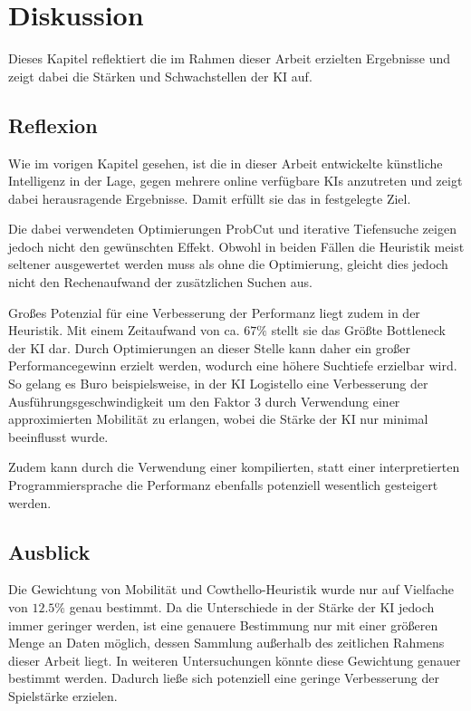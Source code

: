 
\chapter{Diskussion}
\label{chap:diskussion}
Dieses Kapitel reflektiert die im Rahmen dieser Arbeit erzielten Ergebnisse und zeigt dabei die Stärken und
Schwachstellen der \ac{KI} auf.

\section{Reflexion}
Wie im vorigen Kapitel gesehen, ist die in dieser Arbeit entwickelte künstliche Intelligenz in der Lage, gegen mehrere
online verfügbare \acp{KI} anzutreten und zeigt dabei herausragende Ergebnisse. Damit erfüllt sie das in \label{sec:goal}
festgelegte Ziel.

Die dabei verwendeten Optimierungen ProbCut und iterative Tiefensuche zeigen jedoch nicht den gewünschten Effekt.
Obwohl in beiden Fällen die Heuristik meist seltener ausgewertet werden muss als ohne die Optimierung, gleicht dies jedoch
nicht den Rechenaufwand der zusätzlichen Suchen aus.

Großes Potenzial für eine Verbesserung der Performanz liegt zudem in der Heuristik. Mit einem Zeitaufwand von ca.
\(67\%\) stellt sie das Größte Bottleneck der \ac{KI} dar. Durch Optimierungen an dieser Stelle kann daher ein großer
Performancegewinn erzielt werden, wodurch eine höhere Suchtiefe erzielbar wird. So gelang es Buro beispielsweise, in der
\ac{KI} Logistello eine Verbesserung der Ausführungsgeschwindigkeit um den Faktor 3 durch Verwendung einer approximierten
Mobilität zu erlangen, wobei die Stärke der \ac{KI} nur minimal beeinflusst wurde. \cite[S.~8]{evaluationfunctions}

Zudem kann durch die Verwendung einer kompilierten, statt einer interpretierten Programmiersprache die Performanz
ebenfalls potenziell wesentlich gesteigert werden.


\section{Ausblick}
Die Gewichtung von Mobilität und Cowthello-Heuristik wurde nur auf Vielfache von \(12.5\%\) genau bestimmt. Da die
Unterschiede in der Stärke der \ac{KI} jedoch immer geringer werden, ist eine genauere Bestimmung nur mit einer größeren
Menge an Daten möglich, dessen Sammlung außerhalb des zeitlichen Rahmens dieser Arbeit liegt. In weiteren Untersuchungen
könnte diese Gewichtung genauer bestimmt werden. Dadurch ließe sich potenziell eine geringe Verbesserung der Spielstärke
erzielen.

